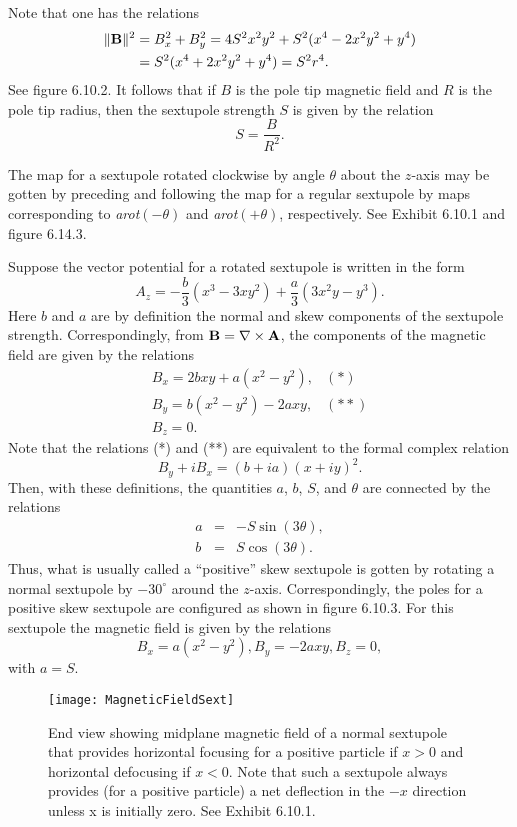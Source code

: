    Note that one has the relations
\begin{eqnarray*}
\|{\bf B}\|^2 &= B_x^2 + B_y^2 = 4S^2 x^2 y^2 + S^2(x^4-2x^2 y^2 + y^4)\\
&=S^2(x^4 + 2x^2 y^2 + y^4) = S^2 r^4.
\end{eqnarray*}
See figure 6.10.2.  It follows that if $B$ is the pole tip magnetic field and $R$ is the pole tip radius, then the sextupole strength $S$ is given by the relation
\[S=\frac{B}{R^2}.\]

   The map for a sextupole rotated clockwise by angle $\theta$ about the
   $z$-axis may be gotten by preceding and following the map for a
   regular sextupole by maps corresponding to {\em arot}$(-\theta)$ and {\em arot}$(+\theta)$, respectively.  See Exhibit 6.10.1 and figure 6.14.3.

   Suppose the vector potential for a rotated sextupole is written in the form
\[A_z = -\frac{b}{3}(x^3 - 3xy^2) + \frac{a}{3}(3x^2 y - y^3). \]
Here $b$ and $a$ are by definition the normal and skew components of the
sextupole strength.  Correspondingly, from ${\bf B} = \nabla \times
{\bf A}$, the components of the magnetic field are given by the relations
\[\begin{array}{cl}
B_x=2bxy+a(x^2 - y^2),&(*)\\
B_y=b(x^2-y^2)-2axy,&(**)\\
B_z =0.
\end{array}\]
Note that the relations (*) and (**) are equivalent to the formal complex relation
\[B_y + iB_x = (b+ia)(x + iy)^2.\]
Then, with these definitions, the quantities $a$, $b$, $S$, and $\theta$ are connected by the relations
\begin{eqnarray*}
a&=&-S\sin(3\theta) ,\\
b&=&S\cos(3\theta).
\end{eqnarray*}
Thus, what is usually called a ``positive'' skew sextupole is gotten by
rotating a normal sextupole by $-30^\circ$ around the $z$-axis.
Correspondingly, the poles for a positive skew sextupole are configured as shown in figure 6.10.3.  For this sextupole the magnetic field is given by the relations
\[B_x = a(x^2 - y^2) , B_y = -2axy , B_z = 0, \]
with $a=S$.


\begin{figure}[hp]
  \centering
  \texttt{[image: MagneticFieldSext]}
  \caption{End view showing midplane magnetic field of a normal
sextupole that provides horizontal focusing for a positive particle if
$x > 0$ and horizontal defocusing if $x < 0$.  Note that such a sextupole
always provides (for a positive particle) a net deflection in the $-x$
direction unless x is initially zero.  See Exhibit 6.10.1.}
\end{figure}


